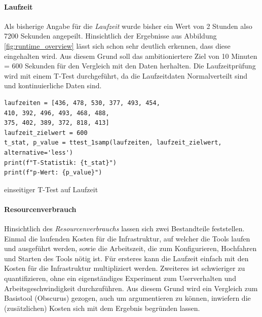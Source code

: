 \paragraph{Laufzeit}
Als bisherige Angabe für die \textit{Laufzeit} wurde bisher ein Wert von 2 Stunden also 7200 Sekunden angepeilt. Hinsichtlich der Ergebnisse aus Abbildung \ref{fig:runtime_overview} lässt sich schon sehr deutlich erkennen, dass diese eingehalten wird. Aus diesem Grund soll das ambitioniertere Ziel von 10 Minuten = 600 Sekunden für den Vergleich mit den Daten herhalten.
Die Laufzeitprüfung wird mit einem T-Test durchgeführt, da die Laufzeitdaten Normalverteilt sind und kontinuierliche Daten sind.
\begin{listing}
    \begin{verbatim}
laufzeiten = [436, 478, 530, 377, 493, 454, 
410, 392, 496, 493, 468, 488,
375, 402, 389, 372, 818, 413]
laufzeit_zielwert = 600
t_stat, p_value = ttest_1samp(laufzeiten, laufzeit_zielwert, alternative='less')
print(f"T-Statistik: {t_stat}")
print(f"p-Wert: {p_value}")
    \end{verbatim}
    \caption{einseitiger T-Test auf Laufzeit}
    \label{listing:Laufzeittest}
\end{listing}
\paragraph{Resourcenverbrauch}
Hinsichtlich des \textit{Resourcenverbrauchs} lassen sich zwei Bestandteile feststellen. Einmal die laufenden Kosten für die Infrastruktur, auf welcher die Tools laufen und ausgeführt werden, sowie die Arbeitszeit, die zum Konfigurieren, Hochfahren und Starten des Tools nötig ist. Für ersteres kann die Laufzeit einfach mit den Kosten für die Infrastruktur multipliziert werden.
Zweiteres ist schwieriger zu quantifizieren, ohne ein eigenständiges Experiment zum Userverhalten und Arbeitsgeschwindigkeit durchzuführen. Aus diesem Grund wird ein Vergleich zum Basistool (Obscurus) gezogen, auch um argumentieren zu können, inwiefern die (zusätzlichen) Kosten sich mit dem Ergebnis begründen lassen.
